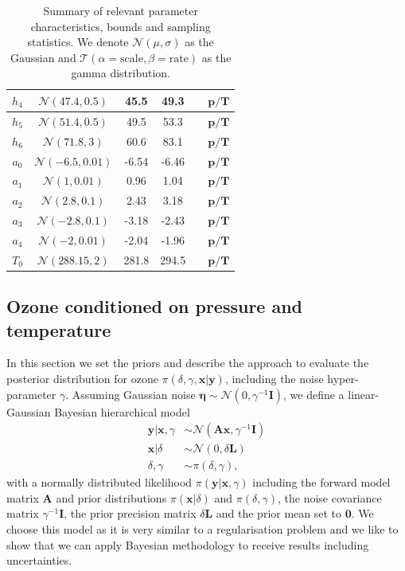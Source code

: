 \begin{table}
\begin{tabular}{ |c||c|c|c|c|c|   }
		$h_{4}$ &  $\mathcal{N}(47.4,0.5)$&45.5 &49.3&&$\bm{p/T}$\\ \hline
		$h_{5}$ &  $\mathcal{N}(51.4,0.5)$&49.5 &53.3&&$\bm{p/T}$\\ \hline
		$h_{6}$ &  $\mathcal{N}(71.8,3)$&60.6 &83.1&&$\bm{p/T}$\\ \hline
		$a_{0}$ &  $\mathcal{N}(-6.5,0.01)$&-6.54 &-6.46&&$\bm{p/T}$\\ \hline
		$a_{1}$ &  $\mathcal{N}(1,0.01)$&0.96 &1.04&&$\bm{p/T}$\\ \hline
		$a_{2}$ &  $\mathcal{N}(2.8,0.1)$&2.43 &3.18&&$\bm{p/T}$\\ \hline
		$a_{3}$ &  $\mathcal{N}(-2.8,0.1)$&-3.18 &-2.43&&$\bm{p/T}$\\ \hline
		$a_{4}$ & $\mathcal{N}(-2,0.01)$ &-2.04 &-1.96&&$\bm{p/T}$\\ \hline
		$T_{0}$ &  $\mathcal{N}(288.15,2)$& 281.8 &294.5&&$\bm{p/T}$\\
		\hline
	\end{tabular}
	\caption[Summary of relevant parameter characteristics, bounds and sampling statistics.]{Summary of relevant parameter characteristics, bounds and sampling statistics. We denote $\mathcal{N}(\mu,\sigma)$ as the Gaussian and $\mathcal{T}(\alpha = \text{scale}, \beta = \text{rate})$ as the gamma distribution.}
	\label{tab:priors}
\end{table}

\subsection{Ozone conditioned on pressure and temperature}
In this section we set the priors and describe the approach to evaluate the posterior distribution for ozone $\pi(\delta, \gamma, \bm{x}|\bm{y})$, including the noise hyper-parameter $\gamma$.
Assuming Gaussian noise $\bm{\eta} \sim \mathcal{N}(0, \gamma^{-1} \bm{I})$, we define a linear-Gaussian Bayesian hierarchical model~\cite{fox2016fast}
\begin{subequations}
	\begin{align}
		\bm{y} |  \bm{x}, \gamma &\sim \mathcal{N}(\bm{A} \bm{x}, \gamma^{-1} \bm{I}) \label{eq:likelihood} \\
		\bm{x} |  \delta &\sim \mathcal{N}(0, \delta \bm{L}) \label{eq:xPrior} \\
		 \delta, \gamma &\sim \pi(\delta, \gamma) \label{eq:gammaPrior},
	\end{align}
	\label{eq:BayMode}
\end{subequations}
with a normally distributed likelihood $\pi(\bm{y} |  \bm{x}, \gamma)$ including the forward model matrix $\bm{A}$ and prior distributions $\pi(\bm{x} |  \delta)$ and $\pi(\delta, \gamma)$, the noise covariance matrix $\gamma^{-1} \bm{I}$, the prior precision matrix $\delta \bm{L}$ and the prior mean set to $\bm{0}$.
We choose this model as it is very similar to a regularisation problem and we like to show that we can apply Bayesian methodology to receive results including uncertainties.

